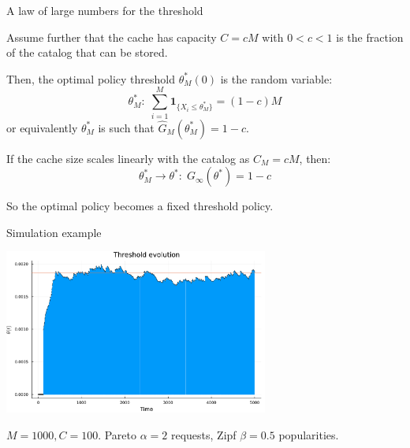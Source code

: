 \documentclass[aspectratio=169]{beamer}
\newcommand{\ind}[1]{\mathbf{1}_{#1}}
\begin{document}



\begin{frame}{A law of large numbers for the threshold}
	
	Assume further that the cache has capacity $C=cM$ with $0<c<1$ is the fraction of the catalog that can be stored.

	\pause

	Then, the optimal policy threshold $\theta^*_M(0)$ is the random variable:
	\begin{equation*}
		\theta^*_M: \; \sum_{i=1}^M \ind{\{X_i\leqslant \theta^*_M\}} = (1-c)M
	\end{equation*}
	or equivalently $\theta^*_M$ is such that $\hat{G}_M(\theta^*_M) = 1-c$.


	\pause \vfill

	\begin{corollary}
		If the cache size scales linearly with the catalog as $C_M = cM$, then:
		\begin{equation*}
			\theta^*_M \to \theta^*: \; G_\infty(\theta^*) = 1-c
		\end{equation*}
	\end{corollary}

	So the optimal policy becomes a \alert{fixed} threshold policy.
\end{frame}

\begin{frame}{Simulation example}
	\begin{center}
		\includegraphics[width=0.65\textwidth]{figuras/simulation_example.pdf}

		{\footnotesize $M=1000, C=100$. Pareto $\alpha=2$ requests, Zipf $\beta=0.5$  popularities.}
	\end{center}
\end{frame}
\end{document}
